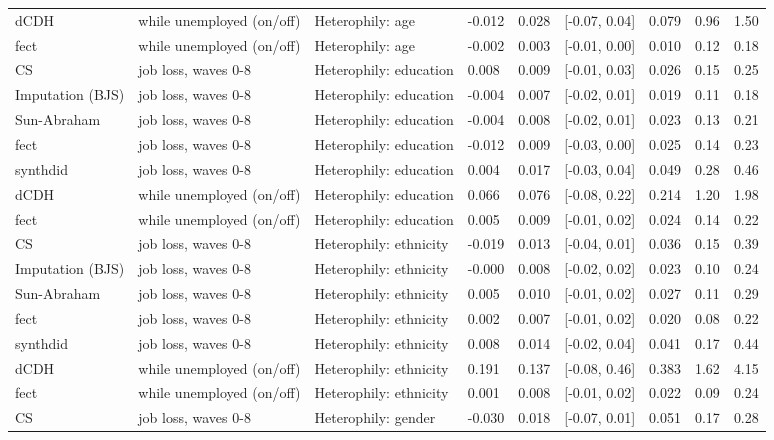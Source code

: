 \begin{tabular}{lllllllll}
dCDH & while unemployed (on/off) & Heterophily: age & -0.012 & 0.028 & {}[-0.07, 0.04] & 0.079 & 0.96 & 1.50\\
fect & while unemployed (on/off) & Heterophily: age & -0.002 & 0.003 & {}[-0.01, 0.00] & 0.010 & 0.12 & 0.18\\
CS & job loss, waves 0-8 & Heterophily: education & 0.008 & 0.009 & {}[-0.01, 0.03] & 0.026 & 0.15 & 0.25\\
Imputation (BJS) & job loss, waves 0-8 & Heterophily: education & -0.004 & 0.007 & {}[-0.02, 0.01] & 0.019 & 0.11 & 0.18\\
Sun-Abraham & job loss, waves 0-8 & Heterophily: education & -0.004 & 0.008 & {}[-0.02, 0.01] & 0.023 & 0.13 & 0.21\\
fect & job loss, waves 0-8 & Heterophily: education & -0.012 & 0.009 & {}[-0.03, 0.00] & 0.025 & 0.14 & 0.23\\
synthdid & job loss, waves 0-8 & Heterophily: education & 0.004 & 0.017 & {}[-0.03, 0.04] & 0.049 & 0.28 & 0.46\\
dCDH & while unemployed (on/off) & Heterophily: education & 0.066 & 0.076 & {}[-0.08, 0.22] & 0.214 & 1.20 & 1.98\\
fect & while unemployed (on/off) & Heterophily: education & 0.005 & 0.009 & {}[-0.01, 0.02] & 0.024 & 0.14 & 0.22\\
CS & job loss, waves 0-8 & Heterophily: ethnicity & -0.019 & 0.013 & {}[-0.04, 0.01] & 0.036 & 0.15 & 0.39\\
Imputation (BJS) & job loss, waves 0-8 & Heterophily: ethnicity & -0.000 & 0.008 & {}[-0.02, 0.02] & 0.023 & 0.10 & 0.24\\
Sun-Abraham & job loss, waves 0-8 & Heterophily: ethnicity & 0.005 & 0.010 & {}[-0.01, 0.02] & 0.027 & 0.11 & 0.29\\
fect & job loss, waves 0-8 & Heterophily: ethnicity & 0.002 & 0.007 & {}[-0.01, 0.02] & 0.020 & 0.08 & 0.22\\
synthdid & job loss, waves 0-8 & Heterophily: ethnicity & 0.008 & 0.014 & {}[-0.02, 0.04] & 0.041 & 0.17 & 0.44\\
dCDH & while unemployed (on/off) & Heterophily: ethnicity & 0.191 & 0.137 & {}[-0.08, 0.46] & 0.383 & 1.62 & 4.15\\
fect & while unemployed (on/off) & Heterophily: ethnicity & 0.001 & 0.008 & {}[-0.01, 0.02] & 0.022 & 0.09 & 0.24\\
CS & job loss, waves 0-8 & Heterophily: gender & -0.030 & 0.018 & {}[-0.07, 0.01] & 0.051 & 0.17 & 0.28\\

\end{tabular}
